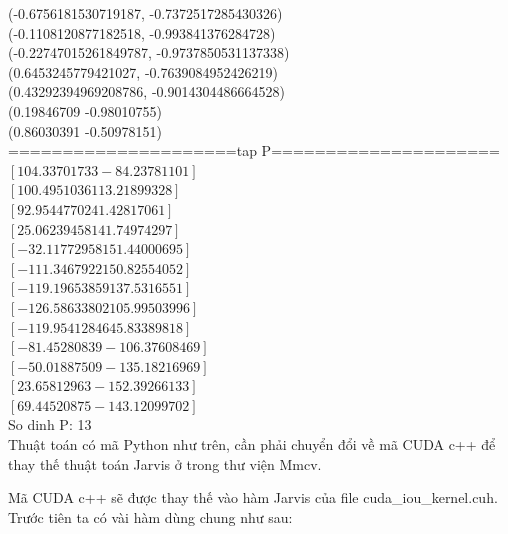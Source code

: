 \documentclass[12pt,a4paper,openany,oneside]{report}
\begin{document}
(-0.6756181530719187, -0.7372517285430326)\\
(-0.1108120877182518, -0.993841376284728)\\
(-0.22747015261849787, -0.9737850531137338)\\
(0.6453245779421027, -0.7639084952426219)\\
(0.43292394969208786, -0.9014304486664528)\\
(0.19846709 -0.98010755)\\
(0.86030391 -0.50978151)\\
=====================tap P=====================\\
$\left[104.33701733 -84.23781101\right]$\\
$\left[100.49510361  13.21899328\right]$\\
$\left[92.95447702 41.42817061\right]$\\
$\left[ 25.06239458 141.74974297\right]$\\
$\left[-32.11772958 151.44000695\right]$\\
$\left[-111.3467922   150.82554052\right]$\\
$\left[-119.19653859  137.5316551 \right]$\\
$\left[-126.58633802  105.99503996\right]$\\
$\left[-119.95412846   45.83389818\right]$\\
$\left[ -81.45280839 -106.37608469\right]$\\
$\left[ -50.01887509 -135.18216969\right]$\\
$\left[  23.65812963 -152.39266133\right]$\\
$\left[  69.44520875 -143.12099702\right]$\\
So dinh P:  13\\


Thuật toán có mã Python như trên, cần phải chuyển đổi về mã CUDA c++ để thay thế thuật toán Jarvis ở trong thư viện Mmcv. 

Mã CUDA c++ sẽ được thay thế vào hàm Jarvis của file cuda\_iou\_kernel.cuh. Trước tiên ta có vài hàm dùng chung như sau:
\end{document}
